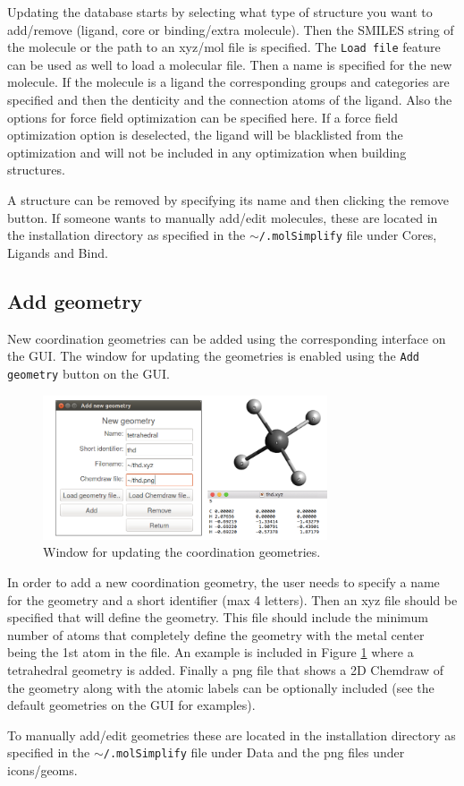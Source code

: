 \documentclass[a4paper,12pt]{assignment}
\begin{document}
Updating the database starts by selecting what type of structure you want to add/remove (ligand, core or binding/extra molecule). Then the SMILES string of the molecule or the path to an xyz/mol file is specified. The \texttt{Load file} feature can be used as well to load a molecular file. Then a name is specified for the new molecule. If the molecule is a ligand the corresponding groups and categories are specified and then the denticity and the connection atoms of the ligand. Also the options for force field optimization can be specified here. If a force field optimization option is deselected, the ligand will be blacklisted from the optimization and will not be included in any optimization when building structures. 

A structure can be removed by specifying its name and then clicking the remove button. If someone wants to manually add/edit molecules, these are located in the installation directory as specified in the \texttt{$\sim$/.molSimplify} file under Cores, Ligands and Bind.

\subsection{Add geometry}

New coordination geometries can be added using the corresponding interface on the GUI. The window for updating the geometries is enabled using the \texttt{Add geometry} button on the GUI.

\begin{figure}[htb!]
\centering
\includegraphics[width=0.75\textwidth]{./Figures/fig18.png}
\caption{Window for updating the coordination geometries.}
\label{lg}
\end{figure}

In order to add a new coordination geometry, the user needs to specify a name for the geometry and a short identifier (max 4 letters). Then an xyz file should be specified that will define the geometry. This file should include the minimum number of atoms that completely define the geometry with the metal center being the 1st atom in the file. An example is included in Figure \ref{lg} where a tetrahedral geometry is added. Finally a png file that shows a 2D Chemdraw of the geometry along with the atomic labels can be optionally included (see the default geometries on the GUI for examples).

To manually add/edit geometries these are located in the installation directory as specified in the \texttt{$\sim$/.molSimplify} file under Data and the png files under icons/geoms.




\end{document}
